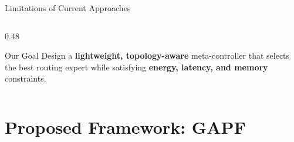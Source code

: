 \documentclass[aspectratio=169, 11pt]{beamer}
\begin{document}
\begin{frame}{Limitations of Current Approaches}
\begin{columns}[T]
\begin{column}{0.48\textwidth}
  \smallskip
  \begin{exampleblock}{Our Goal}
    Design a \textbf{lightweight, topology-aware} meta-controller that selects the best routing expert while satisfying \textbf{energy, latency, and memory} constraints.
  \end{exampleblock}

\end{column}
\end{columns}

\end{frame}


\section{Proposed Framework: GAPF}
\end{document}
